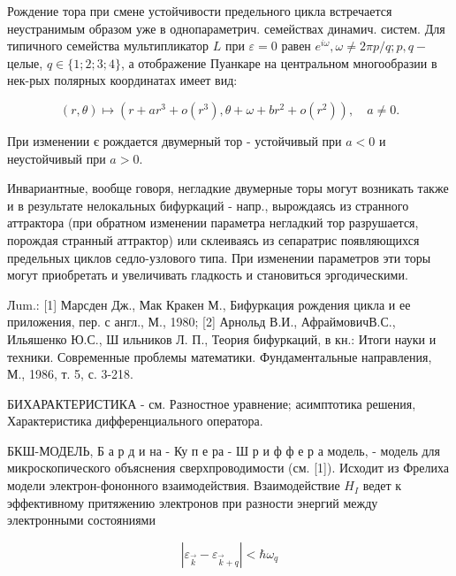 \documentclass[10pt]{article}
\begin{document}
Рождение тора при смене устойчивости предельного цикла встречается неустранимым образом уже в однопараметрич. семействах динамич. систем. Для типичного семейства мультипликатор $L$ при $\varepsilon=0$ равен $e^{i \omega}, \omega \neq 2 \pi p / q ; p, q-$ целые, $q \in\{1 ; 2 ; 3 ; 4\}$, а отображение Пуанкаре на центральном многообразии в нек-рых полярных координатах имеет вид:



\[

(r, \theta) \mapsto\left(r+a r^{3}+o\left(r^{3}\right), \theta+\omega+b r^{2}+o\left(r^{2}\right)\right), \quad a \neq 0 .

\]



При изменении є рождается двумерный тор - устойчивый при $a<0$ и неустойчивый при $a>0$.



Инвариантные, вообще говоря, негладкие двумерные торы могут возникать также и в результате нелокальных бифуркаций - напр., вырождаясь из странного аттрактора (при обратном изменении параметра негладкий тор разрушается, порождая странный аттрактор) или склеиваясь из сепаратрис появляющихся предельных циклов седло-узлового типа. При изменении параметров эти торы могут приобретать и увеличивать гладкость и становиться эргодическими.



Лum.: [1] Марсден Дж., Мак Кракен М., Бифуркация рождения цикла и ее приложения, пер. с англ., М., 1980; [2] Арнольд В.И., АфраймовичВ.С., Ильяшенко Ю.С., Ш ильников Л. П., Теория бифуркаций, в кн.: Итоги науки и техники. Современные проблемы математики. Фундаментальные направления, М., 1986, т. 5, с. 3-218.



БИХАРАКТЕРИСТИКА - см. Разностное уравнение; асимптотика решения, Характеристика дифференциального оператора.



БКШ-МОДЕЛЬ, Б а р д и на - Ку п е ра - Ш р и ф ф е р а модель, - модель для микроскопического объяснения сверхпроводимости (см. [1]). Исходит из Фрелиха модели электрон-фононного взаимодействия. Взаимодействие $H_{I}$ ведет к эффективному притяжению электронов при разности энергий между электронными состояниями



\[

\left|\varepsilon_{\vec{k}}-\varepsilon_{\vec{k}+q}\right|<\hbar \omega_{q}

\]
\end{document}
